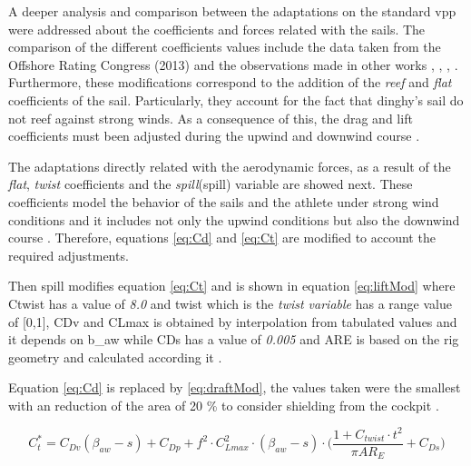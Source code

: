 A deeper analysis and comparison between the adaptations on the standard \acrshort{vpp} were addressed about the coefficients and forces related with the sails. The comparison of the different coefficients values include the data taken from the Offshore Rating Congress (2013) and the observations made in other works \cite{day2017performance}, \cite{carrico17symp}, \cite{binns2002development}, \cite{flay1996twisted}. Furthermore, these modifications correspond to the addition of the \textit{reef} and \textit{flat} coefficients of the sail. Particularly, they account for the fact that dinghy's sail do not reef against strong winds. As a consequence of this, the drag and lift coefficients must been adjusted during the upwind and downwind course \cite{carrico17symp}. \par \noindent
The adaptations directly related with the 
aerodynamic 
forces, as a result of the \textit{flat}, \textit{twist} coefficients and the \textit{spill}(\acrshort{spill}) variable 
are showed next. These coefficients model the behavior of the sails and the athlete under strong wind conditions and it includes not only the upwind conditions but also the downwind course \cite{day2017performance}. %
Therefore, equations \ref{eq:Cd} and \ref{eq:Ct} are modified to account the required adjustments. \par \noindent 
Then \acrshort{spill} modifies equation \ref{eq:Ct} and is shown in equation \ref{eq:liftMod} where \acrshort{Ctwist} has a value of  \textit{8.0} and \acrshort{twist} which is the \textit{twist variable} has a range value of [0,1], \acrshort{CDv} and \acrshort{CLmax} is obtained by interpolation from tabulated values and it depends on \acrshort{b_aw} while \acrshort{CDs} has a value of \textit{0.005} and \acrshort{ARE} is based on the rig geometry and calculated according it \cite{day2017performance}. \par \noindent  
Equation \ref{eq:Cd} is replaced by \ref{eq:draftMod}, the values taken were the smallest with an reduction of the area of 20 \% to consider shielding from the cockpit \cite{day2017performance}.\par 

\begin{equation} \label{eq:liftMod}
    C_{t}^*=C_{Dv}(\beta_{aw}-s)+C_{Dp}+f^2 \cdot C_{Lmax}^2 \cdot (\beta_{aw}-s) \cdot \Big(\frac{1+C_{twist} \cdot t^2}{\pi AR_{E}} + C_{Ds}\Big)
\end{equation}

